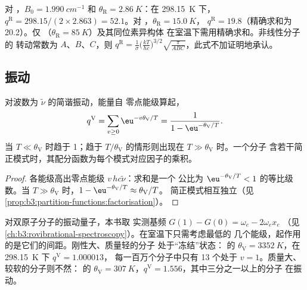对 ，$B_0 = \qty{1.990}{cm^{-1}}$ 和 $\theta_{\mathrm R} = \qty{2.86}{K}$：在 \qty{298.15}{K} 下，
$q^{\mathrm R} = 298.15/(2\times2.863) = 52.1$。对 ，$\theta_{\mathrm R} = \qty{15.0}{K}$，
$q^{\mathrm R} = 19.8$（精确求和为 20.2）。仅 （$\theta_{\mathrm R} = \qty{85}{K}$）及其同位素异构体
在室温下需用精确求和。非线性分子的
转动常数为 $A$、$B$、$C$，则 $q^{\mathrm R} = \frac{1}{\sigma}\bigl(\frac{kT}{hc}\bigr)^{3/2}\sqrt{\frac{\pi}{ABC}}$，此式不加证明地承认。

\subsection*{振动}

\begin{proposition}[振动配分函数]\label{prop:b3:partition-functions:q-vib}
对波数为 $\tilde\nu$ 的简谐振动，能量自
零点能级算起，
\[
  q^{\mathrm V} = \sum_{v\ge0}\eu^{-v\theta_{\mathrm V}/T} = \frac{1}{1 - \eu^{-\theta_{\mathrm V}/T}} .
\]
当 $T \ll \theta_{\mathrm V}$ 时趋于 1；趋于 $T/\theta_{\mathrm V}$ 的情形则出现在 $T \gg \theta_{\mathrm V}$ 时。一个分子
含若干简正模式时，其配分函数为每个模式对应因子的乘积。
\end{proposition}

\begin{proof}
各能级高出零点能级 $v\,hc\tilde\nu$：求和是一个
公比为 $\eu^{-\theta_{\mathrm V}/T} < 1$ 的等比级数。当 $T \gg \theta_{\mathrm V}$ 时，$1 - \eu^{-\theta_{\mathrm V}/T} \approx \theta_{\mathrm V}/T$。
简正模式相互独立（见\cref{prop:b3:partition-functions:factorisation}）。
\end{proof}

对双原子分子的振动量子，本书取
实测基频 $G(1) - G(0) = \omega_e - 2\omega_ex_e$
（见\cref{ch:b3:rovibrational-spectroscopy}）。在室温下只需考虑最低的
几个能级，起作用的是它们的间距。刚性大、质量轻的分子
处于“冻结”状态： 的 $\theta_{\mathrm V} = \qty{3352}{K}$，在 \qty{298.15}{K} 下 $q^{\mathrm V} = 1.000013$，
每一百万个分子中只有 13 个处于 $v = 1$。质量大、较软的分子则不然：
的 $\theta_{\mathrm V} = \qty{307}{K}$，$q^{\mathrm V} = 1.556$，其中三分之一以上的分子
在振动。

